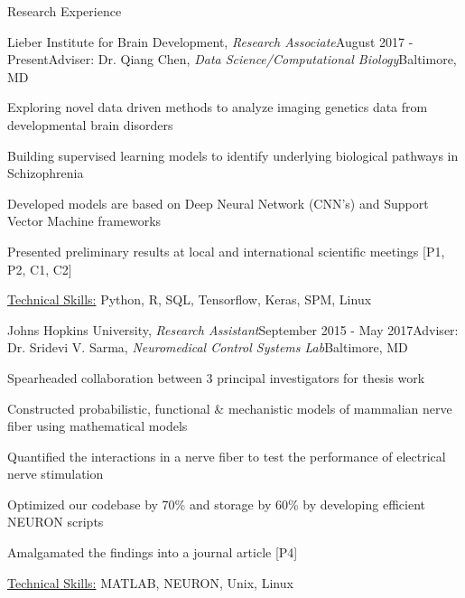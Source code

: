 \documentclass{resume}
\begin{document}
  \vspace{1em}

  \begin{rSection}{Research Experience}
\begin{rSubsection}{Lieber Institute for Brain Development, \textit{Research Associate}}{August 2017 - Present}{Adviser: Dr. Qiang Chen, \textit{Data Science/Computational Biology}}{Baltimore, MD}
\item Exploring novel data driven methods to analyze imaging genetics data from developmental brain disorders
\item Building supervised learning models to identify underlying biological pathways in Schizophrenia
\item Developed models are based on Deep Neural Network (CNN's) and Support Vector Machine frameworks
\item Presented preliminary results at local and international scientific meetings [P1, P2, C1, C2]
\item \uline{Technical Skills:} Python, R, SQL, Tensorflow, Keras, SPM, Linux
    \end{rSubsection}

    \begin{rSubsection}{Johns Hopkins University, \textit{Research Assistant}}{September 2015 - May 2017}{Adviser: Dr. Sridevi V. Sarma, \textit{Neuromedical Control Systems Lab}}{Baltimore, MD}
\item Spearheaded collaboration between 3 principal investigators for thesis work
\item Constructed probabilistic, functional \& mechanistic models of mammalian nerve fiber using mathematical models
\item Quantified the interactions in a nerve fiber to test the performance of electrical nerve stimulation
\item Optimized our codebase by 70\% and storage by 60\% by developing efficient NEURON scripts
\item Amalgamated the findings into a journal article [P4]
\item \uline{Technical Skills:} MATLAB, NEURON, Unix, Linux
    \end{rSubsection}
  

\end{rSection}
\end{document}
